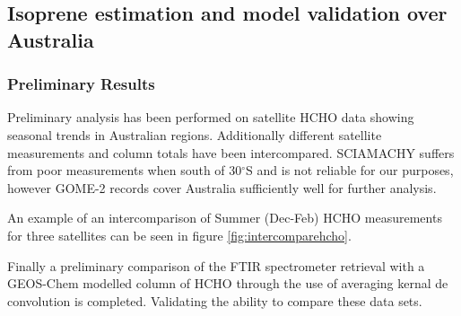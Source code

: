 \subsection{Isoprene estimation and model validation over Australia}

\subsubsection{Preliminary Results}

Preliminary analysis has been performed on satellite HCHO data showing seasonal trends in Australian regions.
Additionally different satellite measurements and column totals have been intercompared.
SCIAMACHY suffers from poor measurements when south of 30$^{\circ}$S and is not reliable for our purposes, however GOME-2 records cover Australia sufficiently well for further analysis. 

An example of an intercomparison of Summer (Dec-Feb) HCHO measurements for three satellites can be seen in figure \ref{fig:intercomparehcho}.

Finally a preliminary comparison of the FTIR spectrometer retrieval with a GEOS-Chem modelled column of HCHO through the use of averaging kernal de convolution is completed.
Validating the ability to compare these data sets.